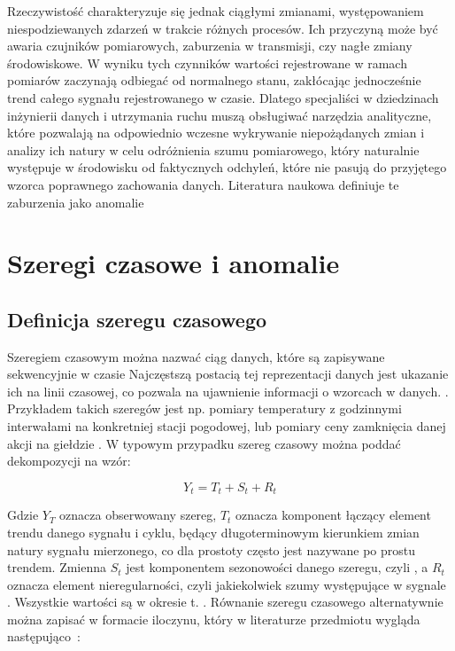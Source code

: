 \documentclass[a4paper,twoside,12pt]{book}
\begin{document}
	Rzeczywistość charakteryzuje się jednak ciągłymi zmianami, występowaniem niespodziewanych zdarzeń w trakcie różnych procesów. Ich przyczyną może być awaria czujników pomiarowych, zaburzenia w transmisji, czy nagłe zmiany środowiskowe. W wyniku tych czynników wartości rejestrowane w ramach pomiarów zaczynają odbiegać od normalnego stanu, zakłócając jednocześnie trend całego sygnału rejestrowanego w czasie. Dlatego specjaliści w dziedzinach inżynierii danych i utrzymania ruchu muszą obsługiwać narzędzia analityczne, które pozwalają na odpowiednio wczesne wykrywanie niepożądanych zmian i analizy ich natury w celu odróżnienia szumu pomiarowego, który naturalnie występuje w środowisku od faktycznych odchyleń, które nie pasują do przyjętego wzorca poprawnego zachowania danych. Literatura naukowa definiuje te zaburzenia jako anomalie\cite{chandola2009anomaly}
	
	\newpage
	\section{Szeregi czasowe i anomalie}

	\subsection{Definicja szeregu czasowego}
		Szeregiem czasowym można nazwać ciąg danych, które są zapisywane sekwencyjnie w czasie \cite{zamanzadeh2024deep} Najczęstszą postacią tej reprezentacji danych jest ukazanie ich na linii czasowej, co pozwala na ujawnienie informacji o wzorcach w danych. \cite{ naqvi2017time}. Przykładem takich szeregów jest np. pomiary temperatury z godzinnymi interwałami na konkretniej stacji pogodowej, lub pomiary ceny zamknięcia danej akcji na giełdzie \cite{naqvi2017time}. W typowym przypadku szereg czasowy można poddać dekompozycji na wzór:
	
	\begin{equation}
		Y_t = T_t + S_t + R_t
	\end{equation}
	
	Gdzie $Y_T$ oznacza obserwowany szereg, $T_t$ oznacza komponent łączący element trendu danego sygnału i cyklu, będący długoterminowym kierunkiem zmian natury sygnału mierzonego, co dla prostoty często jest nazywane po prostu trendem. Zmienna $S_t$ jest komponentem sezonowości danego szeregu, czyli , a $R_t$ oznacza element nieregularności, czyli jakiekolwiek szumy występujące w sygnale . Wszystkie wartości są w okresie t. \cite{dudek2023std}. Równanie szeregu czasowego alternatywnie można zapisać w formacie iloczynu, który w literaturze przedmiotu wygląda następująco~\cite{hyndman2018forecasting}:
	
\end{document}
